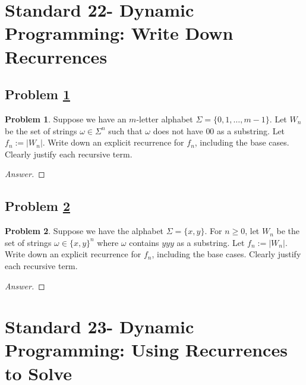 \documentclass[11pt]{article}
\theoremstyle{definition}
\theoremstyle{definition}
\newtheorem{required}{Problem}
\theoremstyle{definition}
\begin{document}
\newpage
\section{Standard 22- Dynamic Programming: Write Down Recurrences}

\subsection{Problem \ref{DP3}}

\begin{required} \label{DP3}
Suppose we have an $m$-letter alphabet $\Sigma = \{0, 1, \ldots, m-1\}$. Let $W_{n}$ be the set of strings $\omega \in \Sigma^{n}$ such that $\omega$ does not have $00$ as a substring. Let $f_{n} := |W_{n}|$. Write down an explicit recurrence for $f_{n}$, including the base cases. Clearly justify each recursive term.
\end{required}

\begin{proof}[Answer]


\end{proof}






\newpage
\subsection{Problem \ref{DP4}}

\begin{required} \label{DP4}
Suppose we have the alphabet $\Sigma = \{x, y\}$. For $n \geq 0$, let $W_{n}$ be the set of strings $\omega \in \{x, y\}^{n}$ where $\omega$ contains $yyy$ as a substring. Let $f_{n} := |W_{n}|$. Write down an explicit recurrence for $f_{n}$, including the base cases. Clearly justify each recursive term.
\end{required}

\begin{proof}[Answer]

\end{proof}




\newpage
\section{Standard 23- Dynamic Programming: Using Recurrences to Solve}
\end{document}
